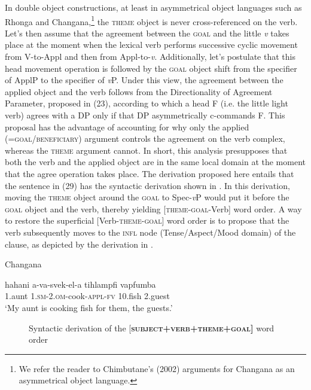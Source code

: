 \documentclass[output=paper]{langsci/langscibook}
\begin{document}
In double object constructions, at least in {asymmetrical object languages such as Rhonga and Changana,}\footnote{ {We refer the reader to Chimbutane’s (2002) arguments for Changana as an asymmetrical object language.}} {}the \textsc{theme} object is never cross-referenced on the verb. Let’s then assume that the agreement between the \textsc{goal} and the little {\textit{v}} takes place at the moment when the lexical verb performs successive cyclic movement from V-to-Appl and then from Appl-to-{\textit{v}}. Additionally, let’s postulate that this head movement operation is followed by the \textsc{goal} object shift from the specifier of ApplP to the specifier of {\textit{v}}P. Under this view, the agreement between the applied object and the verb follows from the Directionality of Agreement Parameter, proposed in (23), according to which a head F (i.e. the little light verb) agrees with a DP only if that DP asymmetrically c-commands F. This proposal has the advantage of accounting for why only the applied (=\textsc{goal/beneficiary}) argument controls the agreement on the verb complex, whereas the \textsc{theme} argument cannot. In short, this analysis presupposes that both the verb and the applied object are in the same local domain at the moment that the agree operation takes place. The derivation proposed here entails that the sentence in (29) has the syntactic derivation shown in . In this derivation, moving the \textsc{theme} object around the \textsc{goal} to Spec-{\textit{v}}P would put it before the \textsc{goal} object and the verb, thereby yielding [\textsc{theme-goal}{}-Verb] word order. A way to restore the superficial [Verb-\textsc{theme-goal}] word order is to propose that the verb subsequently moves to the {\textsc{infl}} node (Tense/Aspect/Mood domain) of the clause, as depicted by the derivation in .

\ea
{Changana}

\gll hahani       a-va-svek-el-a                        tihlampfi      vapfumba\\
     1.aunt        1.{\textsc{sm}}{{}-2.}{\textsc{om}}{{}-}cook{{}-}{\textsc{appl}}{{}-}{\textsc{fv}}      {10.}fish          2.guest\\
\glt ‘My aunt is cooking fish for them, the guests.’
\z

 
\begin{figure}

\caption{Syntactic derivation of the [{\textbf{\textsc{subject+verb+theme+goal]}}} word order}
\label{fig:4}
\end{figure}
\end{document}
